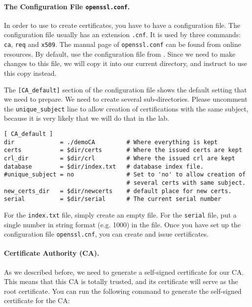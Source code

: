 \paragraph{The Configuration File {\tt openssl.conf}.}
In order to use \OpenSSL to create certificates, you have to have a 
configuration file.
The configuration file usually has an extension
{\tt .cnf}. It is used by three \OpenSSL commands: {\tt ca}, {\tt req} and {\tt x509}. 
The manual page of \texttt{openssl.conf} can be found from online resources. 
By default, \OpenSSL use the configuration file from . 
Since we need to make changes to this file, we will copy it 
into our current directory, and instruct \OpenSSL to use this copy instead. 


The \texttt{[CA\_default]} section of the configuration file shows the 
default setting that we need to prepare.  
We need to create several sub-directories. Please 
uncomment the \texttt{unique\_subject} line to allow 
creation of certifications with the same subject, because it is very
likely that we will do that in the lab. 


\begin{lstlisting}[caption={Default CA setting}]
[ CA_default ]
dir             = ./demoCA         # Where everything is kept
certs           = $dir/certs       # Where the issued certs are kept
crl_dir         = $dir/crl         # Where the issued crl are kept
database        = $dir/index.txt   # database index file.
#unique_subject = no               # Set to 'no' to allow creation of
                                   # several certs with same subject.
new_certs_dir   = $dir/newcerts    # default place for new certs.
serial          = $dir/serial      # The current serial number
\end{lstlisting}


For the \texttt{index.txt} file, simply create an empty file. For 
the \texttt{serial} file, put a single number in string format (e.g. 1000) in the file.
Once you have set up the configuration file \texttt{openssl.cnf}, 
you can create and issue certificates.


\paragraph{Certificate Authority (CA).} 
As we described before, we need to generate a self-signed certificate for our
CA. This means that this CA is totally trusted, and its certificate will serve
as the root certificate.  You can run the following command to generate  
the self-signed certificate for the CA:


